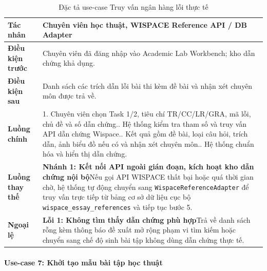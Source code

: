 \begingroup
\small
\begin{longtable}{|p{3.2cm}|p{\dimexpr\linewidth-3.2cm-4\tabcolsep-3\arrayrulewidth\relax}|}
\caption{Đặc tả use-case Truy vấn ngân hàng lỗi thực tế}
\label{aihub:tab:uc_query_references}\\
\hline
\textbf{Tác nhân} & Chuyên viên học thuật, WISPACE Reference API / DB Adapter \\ \hline
\textbf{Điều kiện trước} & Chuyên viên đã đăng nhập vào Academic Lab Workbench; kho dẫn chứng khả dụng. \\ \hline
\textbf{Điều kiện sau} & Danh sách các trích dẫn lỗi bài thi kèm đề bài và nhận xét chuyên môn được trả về. \\ \hline
\textbf{Luồng chính} & 1. Chuyên viên chọn Task 1/2, tiêu chí TR/CC/LR/GRA, mã lỗi, chủ đề và số dẫn chứng.\newline 2. Hệ thống kiểm tra tham số và truy vấn API dẫn chứng Wispace.\newline 3. Kết quả gồm đề bài, loại câu hỏi, trích dẫn, ảnh biểu đồ nếu có và nhận xét chuyên môn.\newline 4. Hệ thống chuẩn hóa và hiển thị dẫn chứng. \\ \hline
\textbf{Luồng thay thế} &
\textbf{Nhánh 1: Kết nối API ngoài gián đoạn, kích hoạt kho dẫn chứng nội bộ}\newline Nếu gọi API WISPACE thất bại hoặc quá thời gian chờ, hệ thống tự động chuyển sang \texttt{WispaceReferenceAdapter} để truy vấn trực tiếp từ bảng cơ sở dữ liệu cục bộ \texttt{wispace\_essay\_references} và tiếp tục bước 5. \\ \hline
\textbf{Ngoại lệ} &
\textbf{Lỗi 1: Không tìm thấy dẫn chứng phù hợp}\newline Trả về danh sách rỗng kèm thông báo đề xuất mở rộng phạm vi tìm kiếm hoặc chuyển sang chế độ sinh bài tập không dùng dẫn chứng thực tế. \\ \hline
\end{longtable}
\endgroup

\paragraph{Use-case 7: Khởi tạo mẫu bài tập học thuật}

